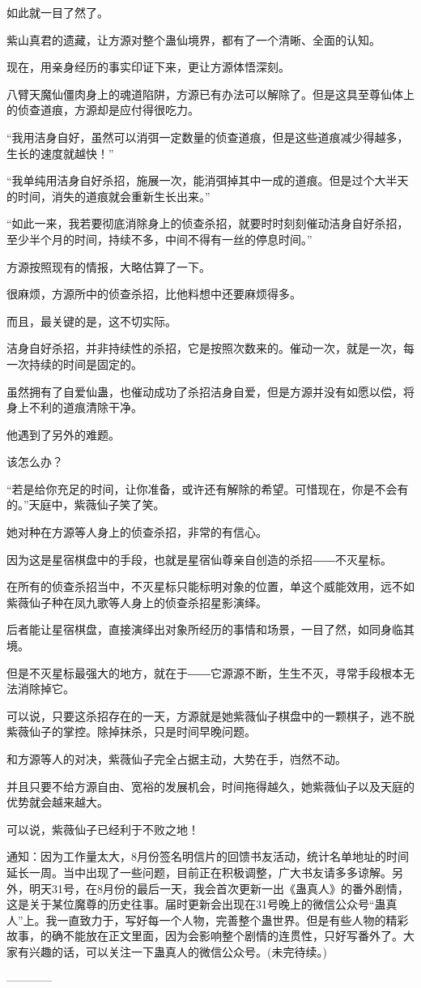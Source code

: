 \begin{this_body}
如此就一目了然了。

紫山真君的遗藏，让方源对整个蛊仙境界，都有了一个清晰、全面的认知。

现在，用亲身经历的事实印证下来，更让方源体悟深刻。

八臂天魔仙僵肉身上的魂道陷阱，方源已有办法可以解除了。但是这具至尊仙体上的侦查道痕，方源却是应付得很吃力。

“我用洁身自好，虽然可以消弭一定数量的侦查道痕，但是这些道痕减少得越多，生长的速度就越快！”

“我单纯用洁身自好杀招，施展一次，能消弭掉其中一成的道痕。但是过个大半天的时间，消失的道痕就会重新生长出来。”

“如此一来，我若要彻底消除身上的侦查杀招，就要时时刻刻催动洁身自好杀招，至少半个月的时间，持续不多，中间不得有一丝的停息时间。”

方源按照现有的情报，大略估算了一下。

很麻烦，方源所中的侦查杀招，比他料想中还要麻烦得多。

而且，最关键的是，这不切实际。

洁身自好杀招，并非持续性的杀招，它是按照次数来的。催动一次，就是一次，每一次持续的时间是固定的。

虽然拥有了自爱仙蛊，也催动成功了杀招洁身自爱，但是方源并没有如愿以偿，将身上不利的道痕清除干净。

他遇到了另外的难题。

该怎么办？

“若是给你充足的时间，让你准备，或许还有解除的希望。可惜现在，你是不会有的。”天庭中，紫薇仙子笑了笑。

她对种在方源等人身上的侦查杀招，非常的有信心。

因为这是星宿棋盘中的手段，也就是星宿仙尊亲自创造的杀招――不灭星标。

在所有的侦查杀招当中，不灭星标只能标明对象的位置，单这个威能效用，远不如紫薇仙子种在凤九歌等人身上的侦查杀招星影演绎。

后者能让星宿棋盘，直接演绎出对象所经历的事情和场景，一目了然，如同身临其境。

但是不灭星标最强大的地方，就在于――它源源不断，生生不灭，寻常手段根本无法消除掉它。

可以说，只要这杀招存在的一天，方源就是她紫薇仙子棋盘中的一颗棋子，逃不脱紫薇仙子的掌控。除掉抹杀，只是时间早晚问题。

和方源等人的对决，紫薇仙子完全占据主动，大势在手，岿然不动。

并且只要不给方源自由、宽裕的发展机会，时间拖得越久，她紫薇仙子以及天庭的优势就会越来越大。

可以说，紫薇仙子已经利于不败之地！

通知：因为工作量太大，8月份签名明信片的回馈书友活动，统计名单地址的时间延长一周。当中出现了一些问题，目前正在积极调整，广大书友请多多谅解。另外，明天31号，在8月份的最后一天，我会首次更新一出《蛊真人》的番外剧情，这是关于某位魔尊的历史往事。届时更新会出现在31号晚上的微信公众号“蛊真人”上。我一直致力于，写好每一个人物，完善整个蛊世界。但是有些人物的精彩故事，的确不能放在正文里面，因为会影响整个剧情的连贯性，只好写番外了。大家有兴趣的话，可以关注一下蛊真人的微信公众号。(未完待续。)

------------

\end{this_body}

